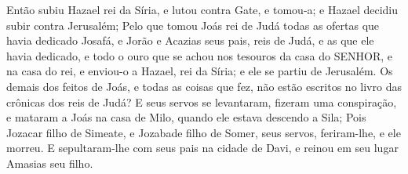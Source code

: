 {  Então subiu Hazael rei da Síria, e lutou contra Gate, e tomou-a; e Hazael decidiu subir contra Jerusalém;
  Pelo que tomou Joás rei de Judá todas as ofertas que havia dedicado Josafá, e Jorão e Acazias seus pais, reis de Judá, e as que ele havia dedicado, e todo o ouro que se achou nos tesouros da casa do SENHOR, e na casa do rei, e enviou-o a Hazael, rei da Síria; e ele se partiu de Jerusalém.
  Os demais dos feitos de Joás, e todas as coisas que fez, não estão escritos no livro das crônicas dos reis de Judá?
  E seus servos se levantaram, fizeram uma conspiração, e mataram a Joás na casa de Milo, quando ele estava descendo a Sila;
  Pois Jozacar filho de Simeate, e Jozabade filho de Somer, seus servos, feriram-lhe, e ele morreu. E sepultaram-lhe com seus pais na cidade de Davi, e reinou em seu lugar Amasias seu filho.
\par }

